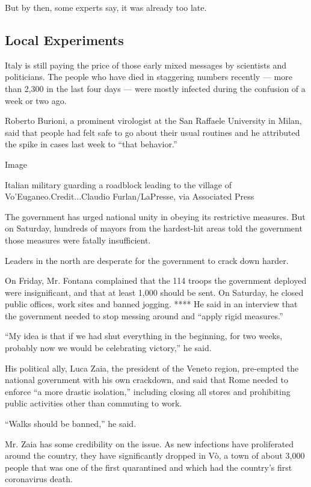 But by then, some experts say, it was already too late.

\hypertarget{local-experiments}{%
\subsection{Local Experiments}\label{local-experiments}}

Italy is still paying the price of those early mixed messages by
scientists and politicians. The people who have died in staggering
numbers recently --- more than 2,300 in the last four days --- were
mostly infected during the confusion of a week or two ago.

Roberto Burioni, a prominent virologist at the San Raffaele University
in Milan, said that people had felt safe to go about their usual
routines and he attributed the spike in cases last week to ``that
behavior.''

Image

Italian military guarding a roadblock leading to the village of
Vo'Euganeo.Credit...Claudio Furlan/LaPresse, via Associated Press

The government has urged national unity in obeying its restrictive
measures. But on Saturday, hundreds of mayors from the hardest-hit areas
told the government those measures were fatally insufficient.

Leaders in the north are desperate for the government to crack down
harder.

On Friday, Mr. Fontana complained that the 114 troops the government
deployed were insignificant, and that at least 1,000 should be sent. On
Saturday, he closed public offices, work sites and banned jogging. ****
He said in an interview that the government needed to stop messing
around and ``apply rigid measures.''

``My idea is that if we had shut everything in the beginning, for two
weeks, probably now we would be celebrating victory,'' he said.

His political ally, Luca Zaia, the president of the Veneto region,
pre-empted the national government with his own crackdown, and said that
Rome needed to enforce ``a more drastic isolation,'' including closing
all stores and prohibiting public activities other than commuting to
work.

``Walks should be banned,'' he said.

Mr. Zaia has some credibility on the issue. As new infections have
proliferated around the country, they have significantly dropped in Vò,
a town of about 3,000 people that was one of the first quarantined and
which had the country's first coronavirus death.

